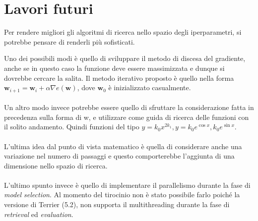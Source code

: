 \section{Lavori futuri}\label{chapter:fuwork}
Per rendere migliori gli algoritmi di ricerca nello spazio degli iperparametri, si
potrebbe pensare di renderli più sofisticati.

Uno dei possibili modi è quello di sviluppare il metodo
di discesa del gradiente, anche se in questo caso la funzione
deve essere massimizzata e dunque si dovrebbe cercare la salita.
Il metodo iterativo proposto è quello nella forma
$\boldsymbol{w}_{i+1} = \boldsymbol{w}_{i} + \alpha \nabla e\left(\boldsymbol{w}\right)$,
dove $\boldsymbol{w}_0$ è inizializzato casualmente.
\\
\\
Un altro modo invece potrebbe essere quello di sfruttare la considerazione
fatta in precedenza sulla forma di w, e utilizzare come guida di ricerca delle funzioni
con il solito andamento. Quindi funzioni del tipo $y=k_0 x^{2k_1}, y=k_0e^{\cos x}, k_0e^{\sin x}$.
\\
\\
L'ultima idea dal punto di vista matematico è quella di considerare anche una variazione nel numero di passaggi
e questo comporterebbe l'aggiunta di una dimensione nello spazio di ricerca.
\\
\\
L'ultimo spunto invece è quello di implementare il parallelismo durante la fase di \textit{model selection}.
Al momento del tirocinio non è stato possibile farlo poiché la versione di Terrier (5.2), 
non supporta il multithreading durante la fase di \textit{retrieval} ed \textit{evaluation}.